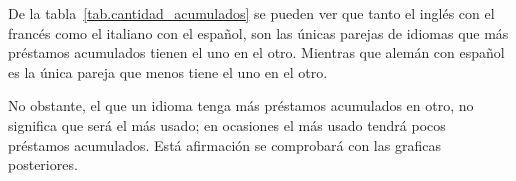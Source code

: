 
De la tabla~\ref{tab.cantidad_acumulados} se pueden ver que tanto el inglés con el francés como el italiano con el español, son las únicas parejas de idiomas que más préstamos acumulados tienen el uno en el otro. Mientras que alemán con español es la única pareja que menos tiene el uno en el otro. 

No obstante, el que un idioma tenga más préstamos acumulados en otro, no significa que será el más usado;  en ocasiones el más usado tendrá pocos préstamos acumulados.  Está afirmación se comprobará con las graficas posteriores. 






